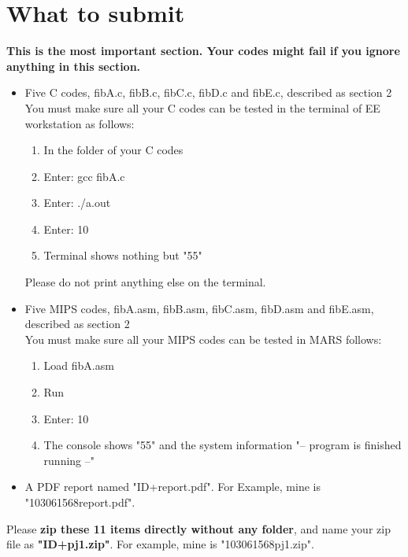 \documentclass{article}
\begin{document}
\section{What to submit}
\textbf{This is the most important section. Your codes might fail if you ignore anything in this section.}
\begin{itemize}
    \item Five C codes, fibA.c, fibB.c, fibC.c, fibD.c and fibE.c, described as section 2\\
        You must make sure all your C codes can be tested in the terminal of EE workstation as follows: 
        \begin{enumerate}
            \item In the folder of your C codes
            \item Enter: gcc fibA.c
            \item Enter: ./a.out
            \item Enter: 10
            \item Terminal shows nothing but "55"
        \end{enumerate}
        Please do not print anything else on the terminal.
    \item Five MIPS codes, fibA.asm, fibB.asm, fibC.asm, fibD.asm and fibE.asm, described as section 2\\
        You must make sure all your MIPS codes can be tested in MARS follows: 
        \begin{enumerate}
            \item Load fibA.asm
            \item Run
            \item Enter: 10
            \item The console shows "55" and the system information "-- program is finished running --"
        \end{enumerate}
    \item A PDF report named "ID+report.pdf". For Example, mine is "103061568report.pdf".
\end{itemize}
Please \textbf{zip these 11 items directly without any folder}, and name your zip file as \textbf{"ID+pj1.zip"}. For example, mine is "103061568pj1.zip".






\end{document}
